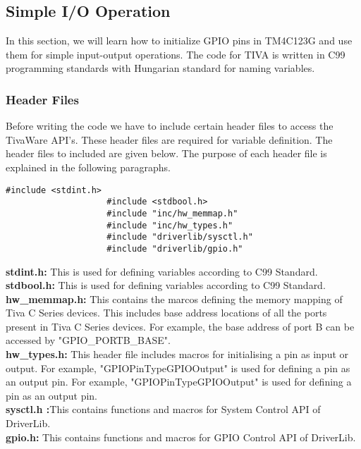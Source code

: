 \documentclass[a4paper,10pt,oneside]{article}
\begin{document}
{		\subsection{\textbf{Simple I/O Operation}}
			{In this section, we will learn how to initialize GPIO pins in TM4C123G and use them for simple input-output operations. The code for TIVA is written in C99 programming standards with Hungarian standard for naming variables. }
			\subsubsection{\textbf{Header Files}}
				{Before writing the code we have to include certain header files to access the TivaWare API's. These header files are required for variable definition. The header files to included are given below. The purpose of each header file is explained in the following paragraphs.
				\begin{lstlisting}[style=CStyle]
					#include <stdint.h>
					#include <stdbool.h>
					#include "inc/hw_memmap.h"
					#include "inc/hw_types.h"
					#include "driverlib/sysctl.h" 
					#include "driverlib/gpio.h"				\end{lstlisting}
				\textbf{stdint.h: }This is used for defining variables according to C99 Standard.\\
				\textbf{stdbool.h: }This is used for defining variables according to C99 Standard.\\
				\textbf{hw\_memmap.h: }This contains the marcos defining the memory mapping of Tiva C Series devices. This includes base address locations of all the ports present in Tiva C Series devices. For example, the base address of port B can be accessed by "GPIO\_PORTB\_BASE". \\
				\textbf{hw\_types.h: }This header file includes macros for initialising a pin as input or output. For example, "GPIOPinTypeGPIOOutput" is used for defining a pin as an output pin. For example, "GPIOPinTypeGPIOOutput" is used for defining a pin as an output pin.  \\ 
				\textbf{sysctl.h :}This contains functions and macros for System Control API of DriverLib. \\
				\textbf{gpio.h: }This contains functions and macros for GPIO Control API of DriverLib. }
}
\end{document}
